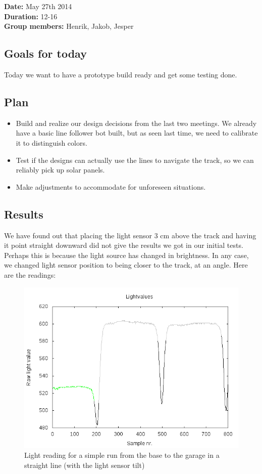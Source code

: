 \textbf{Date:} May 27th 2014\\\textbf{Duration:} 12-16\\\textbf{Group
members:} Henrik, Jakob, Jesper

\subsection{Goals for today}

Today we want to have a prototype build ready and get some testing done.

\subsection{Plan}

\begin{itemize}
\itemsep1pt\parskip0pt
\item
  Build and realize our design decisions from the last two meetings. We
  already have a basic line follower bot built, but as seen last time,
  we need to calibrate it to distinguish colors.
\item
  Test if the designs can actually use the lines to navigate the track,
  so we can reliably pick up solar panels.
\item
  Make adjustments to accommodate for unforeseen situations.
\end{itemize}

\subsection{Results}

We have found out that placing the light sensor 3 cm above the track and
having it point straight downward did not give the results we got in our
initial tests. Perhaps this is because the light source has changed in
brightness. In any case, we changed light sensor position to being
closer to the track, at an angle. Here are the
readings:
\begin{figure}[hbt]
  \centering
  \includegraphics[scale=0.5]{../experiments/1prototype/results/gnuplot/GridAccuracyTilt_color.png}
  \caption{Light reading for a simple run from the base to the garage in a straight line (with the light sensor tilt)}
\end{figure}

